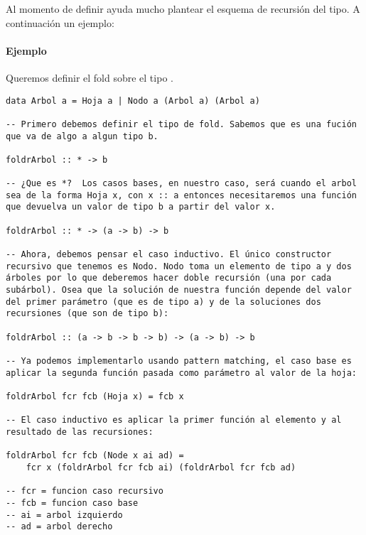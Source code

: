 Al momento de definir  ayuda mucho plantear el esquema de recursión del tipo. A continuación un ejemplo:

\paragraph{Ejemplo} Queremos definir el fold sobre el tipo .

\begin{centrado}
\begin{verbatim}
data Arbol a = Hoja a | Nodo a (Arbol a) (Arbol a)

-- Primero debemos definir el tipo de fold. Sabemos que es una fución que va de algo a algun tipo b.

foldrArbol :: * -> b

-- ¿Que es *?  Los casos bases, en nuestro caso, será cuando el arbol sea de la forma Hoja x, con x :: a entonces necesitaremos una función que devuelva un valor de tipo b a partir del valor x.

foldrArbol :: * -> (a -> b) -> b

-- Ahora, debemos pensar el caso inductivo. El único constructor recursivo que tenemos es Nodo. Nodo toma un elemento de tipo a y dos árboles por lo que deberemos hacer doble recursión (una por cada subárbol). Osea que la solución de nuestra función depende del valor del primer parámetro (que es de tipo a) y de la soluciones dos recursiones (que son de tipo b):

foldrArbol :: (a -> b -> b -> b) -> (a -> b) -> b

-- Ya podemos implementarlo usando pattern matching, el caso base es aplicar la segunda función pasada como parámetro al valor de la hoja:

foldrArbol fcr fcb (Hoja x) = fcb x 

-- El caso inductivo es aplicar la primer función al elemento y al resultado de las recursiones:

foldrArbol fcr fcb (Node x ai ad) = 
	fcr x (foldrArbol fcr fcb ai) (foldrArbol fcr fcb ad)

-- fcr = funcion caso recursivo
-- fcb = funcion caso base
-- ai = arbol izquierdo
-- ad = arbol derecho
\end{verbatim}
\end{centrado}